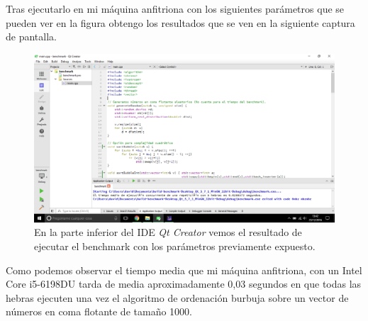 Tras ejecutarlo en mi máquina anfitriona con los siguientes parámetros que se pueden ver en la figura
obtengo los resultados que se ven en la siguiente captura de pantalla.

\begin{figure}[H]
	\centering
	\includegraphics[scale=0.3]{ejecucion.png}
	\caption{En la parte inferior del IDE \textit{Qt Creator} vemos el resultado de ejecutar el benchmark con los parámetros previamente expuesto.}
\end{figure}

Como podemos observar el tiempo media que mi máquina anfitriona, con un Intel Core i5-6198DU tarda de media aproximadamente 0,03 segundos en que todas las hebras ejecuten una vez el algoritmo de ordenación burbuja sobre un vector de números en coma flotante de tamaño 1000. 

